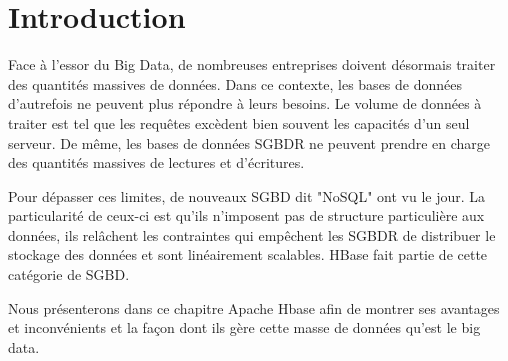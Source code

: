 \section*{Introduction}
Face à l’essor du Big Data, de nombreuses entreprises doivent désormais traiter des quantités massives de données. Dans ce contexte, les bases de données d’autrefois ne peuvent plus répondre à leurs besoins. Le volume de données à traiter est tel que les requêtes excèdent bien souvent les capacités d’un seul serveur. De même, les bases de données SGBDR ne peuvent prendre en charge des quantités massives de lectures et d’écritures.

Pour dépasser ces limites, de nouveaux SGBD dit "NoSQL" ont vu le jour. La particularité de ceux-ci est qu'ils n'imposent pas de structure particulière aux données, ils relâchent les contraintes qui empêchent les SGBDR de distribuer le stockage des données et sont linéairement scalables. HBase fait partie de cette catégorie de SGBD.

Nous présenterons dans ce chapitre Apache Hbase afin de montrer ses avantages et inconvénients et la façon dont ils gère cette masse de données qu'est le big data.